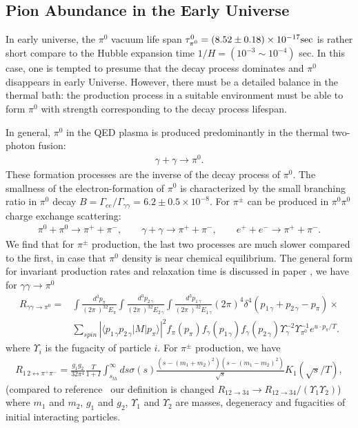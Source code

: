 \documentclass[universe,article,submit,moreauthors,pdftex,a4paper]{Definitions/mdpi}
\begin{document}
\subsection{Pion Abundance in the Early Universe}\label{sec:Pions}
\noindent 
In early universe, the $\pi^0$ vacuum life span $\tau_{\pi^0}^0=(8.52\pm0.18)\times10^{-17} {\rm sec}$ is rather short compare to the Hubble expansion time $1/H=(10^{-3}\sim10^{-4})$ sec. In this case, one is tempted to presume that the decay process dominates and $\pi^0$ disappears in early Universe. However, there must be a detailed balance in the thermal bath: the production process in a suitable environment must be able to form $\pi^0$ with strength corresponding to the decay process lifespan. 

In general, $\pi^0$ in the QED plasma is produced predominantly in the thermal two-photon fusion:
\begin{align}
\gamma+\gamma \rightarrow \pi^{0}. 
\end{align}
These formation processes are the inverse of the decay process of $\pi^0$. The smallness of the electron-formation of $\pi^0$ is characterized by the small  branching ratio in $\pi^0$ decay $B=\Gamma_{ee}/\Gamma_{\gamma\gamma}=6.2\pm 0.5\times10^{-8}$.
For $\pi^{\pm}$ can be produced in $\pi^0\pi^0$ charge exchange scattering:
\begin{align}
\pi^0 + \pi^0 \rightarrow \pi^{+} + \pi^{-}, \qquad\gamma+\gamma \rightarrow \pi^{+} + \pi^{-}, \qquad
e^+ + e^- \rightarrow \pi^{+} + \pi^{-}. 
\end{align}
We find  that for $\pi^{\pm}$ production, the last two processes are much slower compared to the first, in case that $\pi^0$ density is near chemical equilibrium. The general form for invariant production rates and relaxation time is discussed in paper \cite{Kuznetsova:2008jt}, we have for $\gamma\gamma\to\pi^0$
\begin{align}
R_{\gamma\gamma\to\pi^0}=&\int\frac{d^{3}{p_{\pi}}}{(2\pi\ )^32E_{\pi}}
   \int\frac{d^{3} {p_{2\,\gamma}}}{(2\pi\ )^32E_{2\,\gamma}}
   \int\frac{d^{3}{p_{1\,\gamma}}} {(2\pi\ )^32E_{1\,\gamma} }\left(2\pi\right)^{4}
 \delta^{4}\left(p_{1\,\gamma}+p_{2\,\gamma}-p_{\pi}\right)\times \nonumber\\ &
  \sum_{spin}\left|\langle p_{1\,\gamma}p_{2\,\gamma}\left| M\right|p_{\pi}\rangle\right|^{2}
   f_{\pi}(p_{\pi})f_{\gamma}(p_{1\,\gamma})f_{\gamma}(p_{2\,\gamma})
 \Upsilon^{-2}_{\gamma}\Upsilon_{\pi^{0}}^{-1}e^{u \cdot p_{\pi}/T}. \label{pi0pr}
 \end{align}
where $\Upsilon_i$ is the fugacity of particle $i$. For $\pi^\pm$ production, we have
\begin{align}
{R_{1\,2 \leftrightarrow \pi^+\pi^-}} = \frac{g_1g_2}{32\pi^4}\frac{T}{1+I}
\int_{s_{th}}^{\infty}ds\sigma(s)\frac{(s-(m_{1}+m_2)^2)(s-(m_1-m_2)^2)}{\sqrt{s}}K_1(\sqrt{s}/T),
\end{align}
(compared to reference~\cite{Letessier:2002ony} our definition is changed 
$R_{12\rightarrow 34} \rightarrow 
R_{12 \rightarrow 34}/(\Upsilon_1 \Upsilon_2)$)
where $m_1$ and $m_2$, $g_1$ and $g_2$, $\Upsilon_1$ and $\Upsilon_2$ are masses, degeneracy and fugacities of initial interacting particles. 
\end{document}
